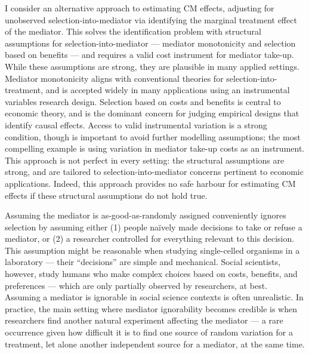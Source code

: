 I consider an alternative approach to estimating CM effects, adjusting for unobserved selection-into-mediator via identifying the marginal treatment effect of the mediator.
This solves the identification problem with structural assumptions for selection-into-mediator --- mediator monotonicity and selection based on benefits --- and requires a valid cost instrument for mediator take-up.
While these assumptions are strong, they are plausible in many applied settings.
Mediator monotonicity aligns with conventional theories for selection-into-treatment, and is accepted widely in many applications using an instrumental variables research design.
Selection based on costs and benefits is central to economic theory, and is the dominant concern for judging empirical designs that identify causal effects.
Access to valid instrumental variation is a strong condition, though is important to avoid further modelling assumptions; the most compelling example is using variation in mediator take-up costs as an instrument.
This approach is not perfect in every setting: the structural assumptions are strong, and are tailored to selection-into-mediator concerns pertinent to economic applications.
Indeed, this approach provides no safe harbour for estimating CM effects if these structural assumptions do not hold true.


Assuming the mediator is as-good-as-randomly assigned conveniently ignores selection by assuming either (1) people na\"ively made decisions to take or refuse a mediator, or (2) a researcher controlled for everything relevant to this decision.
This assumption might be reasonable when studying single-celled organisms in a laboratory --- their ``decisions'' are simple and mechanical.
Social scientists, however, study humans who make complex choices based on costs, benefits, and preferences --- which are only partially observed by researchers, at best.
Assuming a mediator is ignorable in social science contexts is often unrealistic.
In practice, the main setting where mediator ignorability becomes credible is when researchers find another natural experiment affecting the mediator --- a rare occurrence given how difficult it is to find one source of random variation for a treatment, let alone another independent source for a mediator, at the same time.

